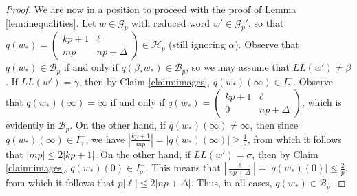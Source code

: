 \documentclass{amsart}     %
\theoremstyle{definition}
\begin{document}
\begin{proof}
We are now in a position to proceed with the proof of Lemma \ref{lem:inequalities}. Let $w \in \mathcal{G}_p$ with reduced word $w' \in \mathcal{G}_p'$, so that $q(w_*) = \begin{pmatrix} kp + 1 & \ell \\ mp & np + \Delta \end{pmatrix} \in \mathcal{H}_p$ (still ignoring $\alpha$). Observe that $q(w_*) \in \mathcal{B}_p$ if and only if $q(\beta_* w_*) \in \mathcal{B}_p$, so we may assume that $LL(w') \neq \beta$. If $LL(w') = \gamma$, then by Claim \ref{claim:images}, $q(w_*)(\infty) \in I_\gamma^-$. Observe that $q(w_*)(\infty) = \infty$ if and only if $q(w_*) = \begin{pmatrix} kp + 1 & \ell \\ 0 & np + \Delta \end{pmatrix}$, which is evidently in $\mathcal{B}_p$. On the other hand, if $q(w_*)(\infty) \neq \infty$, then since $q(w_*)(\infty) \in I_\gamma^-$, we have $|\frac{kp+1}{mp} | = |q(w_*)(\infty)| \geq \frac{1}{2}$, from which it follows that $|mp| \leq 2|kp+1|$. On the other hand, if $LL(w')  = \sigma$, then by Claim \ref{claim:images}, $q(w_*)(0) \in I_\sigma^-$. This means that $|\frac{\ell}{np+\Delta}| = |q(w_*)(0)| \leq \frac{2}{p}$, from which it follows that $p|\ell | \leq 2|np+\Delta|$. Thus, in all cases, $q(w_*) \in \mathcal{B}_p$.
\end{proof}
\end{document}
